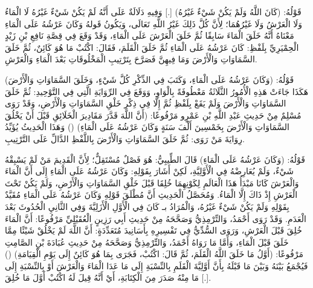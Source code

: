 قَوْلُهُ: (كَانَ اللَّهُ وَلَمْ يَكُنْ شَيْءٌ غَيْرُهُ) [.] وَفِيهِ دَلَالَةٌ عَلَى أَنَّهُ لَمْ يَكُنْ شَيْءٌ غَيْرُهُ لَا الْمَاءُ وَلَا الْعَرْشُ وَلَا غَيْرُهُمَا؛ لِأَنَّ كُلَّ ذَلِكَ غَيْرُ اللَّهِ تَعَالَى، وَيَكُونُ قَولهُ وَكَانَ عَرْشُهُ عَلَى الْمَاءِ مَعْنَاهُ أَنَّهُ خَلَقَ الْمَاءَ سَابِقًا ثُمَّ خَلَقَ الْعَرْشَ عَلَى الْمَاءِ، وَقَدْ وَقَعَ فِي قِصَّةِ نَافِعِ بْنِ زَيْدٍ الْحِمْيَرِيِّ بِلَفْظِ: كَانَ عَرْشُهُ عَلَى الْمَاءِ ثُمَّ خَلَقَ الْقَلَمَ، فَقَالَ: اكْتُبْ مَا هُوَ كَائِنٌ، ثُمَّ خَلَقَ السَّمَاوَاتِ وَالْأَرْضَ وَمَا فِيهِنَّ فَصَرَّحَ بِتَرْتِيبِ الْمَخْلُوقَاتِ بَعْدَ الْمَاءِ وَالْعَرْشِ.

قَوْلُهُ: (وَكَانَ عَرْشُهُ عَلَى الْمَاءِ، وَكَتَبَ فِي الذِّكْرِ كُلَّ شَيْءٍ، وَخَلَقَ السَّمَاوَاتِ وَالْأَرْضَ) هَكَذَا جَاءَتْ هَذِهِ الْأُمُورُ الثَّلَاثَةُ مَعْطُوفَةً بِالْوَاوِ، وَوَقَعَ فِي الرِّوَايَةِ الَّتِي فِي التَّوْحِيدِ: ثُمَّ خَلَقَ السَّمَاوَاتِ وَالْأَرْضَ وَلَمْ يَقَعْ بِلَفْظِ ثُمَّ إِلَّا فِي ذِكْرِ خَلْقِ السَّمَاوَاتِ وَالْأَرْضِ، وَقَدْ رَوَى مُسْلِمٌ مِنْ حَدِيثِ عَبْدِ اللَّهِ بْنِ عَمْرٍو مَرْفُوعًا: (أَنَّ اللَّهَ قَدَّرَ مَقَادِيرَ الْخَلَائِقِ قَبْلَ أَنْ يَخْلُقَ السَّمَاوَاتِ وَالْأَرْضَ بِخَمْسِينَ أَلْفَ سَنَةٍ وَكَانَ عَرْشُهُ عَلَى الْمَاءِ) () وَهَذَا الْحَدِيثُ يُؤَيِّدُ رِوَايَةَ مَنْ رَوَى: ثُمَّ خَلَقَ السَّمَاوَاتِ وَالْأَرْضَ بِاللَّفْظِ الدَّالِّ عَلَى التَّرْتِيبِ.

قَوْلُهُ: (وَكَانَ عَرْشُهُ عَلَى الْمَاءِ) قَالَ الطِّيبِيُّ: هُوَ فَصْلٌ مُسْتَقِلٌّ؛ لِأَنَّ الْقَدِيمَ مَنْ لَمْ يَسْبِقْهُ شَيْءٌ، وَلَمْ يُعَارِضْهُ فِي الْأَوَّلِيَّةِ، لَكِنْ أَشَارَ بِقَوْلِهِ: وَكَانَ عَرْشُهُ عَلَى الْمَاءِ إِلَى أَنَّ الْمَاءَ وَالْعَرْشَ كَانَا مَبْدَأُ هَذَا الْعَالَمِ لِكَوْنِهِمَا خُلِقَا قَبْلَ خَلْقِ السَّمَاوَاتِ وَالْأَرْضِ، وَلَمْ يَكُنْ تَحْتَ الْعَرْشِ إِذْ ذَاكَ إِلَّا الْمَاءُ. وَمُحَصَّلُ الْحَدِيثِ أَنَّ مُطْلَقَ قَوْلِهِ وَكَانَ عَرْشُهُ عَلَى الْمَاءِ مُقَيَّدٌ بِقَوْلِهِ وَلَمْ يَكُنْ شَيْءٌ غَيْرُهُ، وَالْمُرَادُ بـ كَانَ فِي الْأَوَّلِ الْأَزَلِيَّةَ وَفِي الثَّانِيِ الْحُدُوثَ بَعْدَ الْعَدَمِ. وَقَدْ رَوَى أَحْمَدُ، وَالتِّرْمِذِيُّ وَصَحَّحَهُ مِنْ حَدِيثِ أَبِي رَزِينٍ الْعُقَيْلِيِّ مَرْفُوعًا: أَنَّ الْمَاءَ خُلِقَ قَبْلَ الْعَرْشِ، وَرَوَى السُّدِّيُّ فِي تَفْسِيرِهِ بِأَسَانِيدَ مُتَعَدِّدَةٍ: أَنَّ اللَّهَ لَمْ يَخْلُقْ شَيْئًا مِمَّا خَلَقَ قَبْلَ الْمَاءِ، وَأَمَّا مَا رَوَاهُ أَحْمَدُ، وَالتِّرْمِذِيُّ وَصَحَّحَهُ مِنْ حَدِيثِ عُبَادَةَ بْنِ الصَّامِتِ مَرْفُوعًا: (أَوَّلُ مَا خَلَقَ اللَّهُ الْقَلَمَ، ثُمَّ قَالَ: اكْتُبْ، فَجَرَى بِمَا هُوَ كَائِنٌ إِلَى يَوْمِ الْقِيَامَةِ) () فَيُجْمَعُ بَيْنَهُ وَبَيْنَ مَا قَبْلَهُ بِأَنَّ أَوَّلِيَّةَ الْقَلَمِ بِالنِّسْبَةِ إِلَى مَا عَدَا الْمَاءَ وَالْعَرْشَ أَوْ بِالنِّسْبَةِ إِلَى مَا مِنْهُ صَدَرَ مِنَ الْكِتَابَةِ، أَيْ أَنَّهُ قِيلَ لَهُ اكْتُبْ أَوَّلَ مَا خُلِقَ [.].

